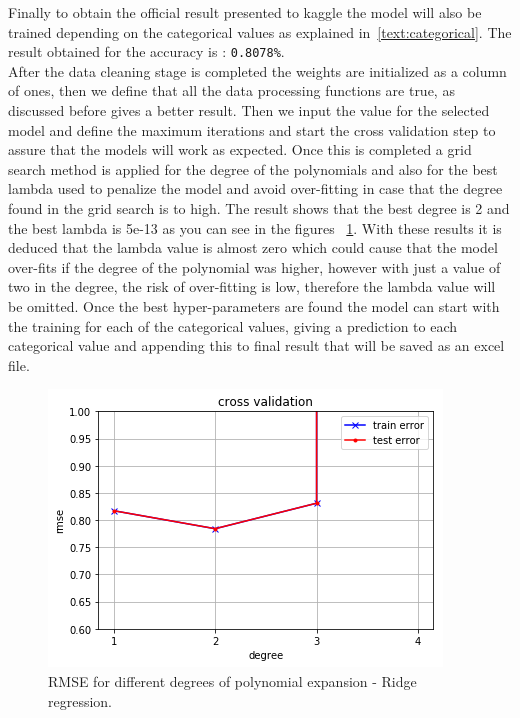 \documentclass[10pt,conference,compsocconf]{IEEEtran}
\begin{document}
 Finally to obtain the official result presented to kaggle the model will also be trained depending
 on the categorical values as explained in~\ref{text:categorical}. The result obtained for the 
 accuracy is :  \texttt{0.8078\%}.\\

After the data cleaning stage is completed the weights are initialized as a column 
of ones, then we define that all the data processing functions are true, as 
discussed before gives a better result. Then we input the value for the selected 
model and define the maximum iterations and start the cross validation step 
to assure that the models will work as expected. Once this is completed a grid search
method is applied for the degree of the polynomials and also for the best
lambda used to penalize the model and avoid over-fitting in case that the 
degree found in the grid search is to high. The result shows that the best degree
is 2  and the best lambda is 5e-13 as you can see in the figures ~\ref{fig:best_degree}. 
With these results it is deduced that the lambda value is almost zero
which could cause that the model over-fits if the degree of the polynomial was
higher, however with just a value of two in the degree, the risk of over-fitting is
low, therefore the lambda value will be omitted. 
Once the best hyper-parameters are found the model can start with the training
for each of the categorical values, giving a prediction to each categorical value
and appending this to final result that will be saved as an excel file.

\begin{figure}[H]
  \centering
  \includegraphics[width=\columnwidth]{cross_validation_degree}
  \caption{RMSE for different degrees of polynomial expansion - Ridge regression.}
  \vspace{-3mm}
  \label{fig:best_degree}
\end{figure}
\end{document}
